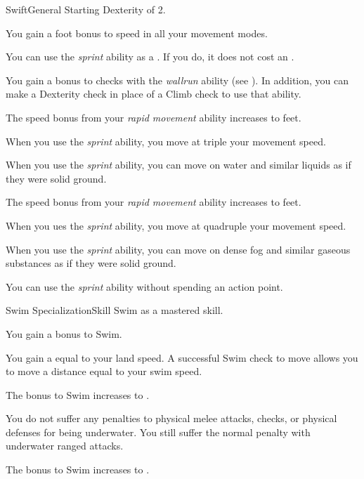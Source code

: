     \begin{feat}{Swift}{General}
        \featpre Starting Dexterity of 2.
        \featben

         You gain a  foot bonus to speed in all your movement modes.

         You can use the \textit{sprint} ability as a .
        If you do, it does not cost an .

         You gain a  bonus to checks with the \textit{wallrun} ability (see ).
        In addition, you can make a Dexterity check in place of a Climb check to use that ability.

         The speed bonus from your \textit{rapid movement} ability increases to  feet.

         When you use the \textit{sprint} ability, you move at triple your movement speed.

         When you use the \textit{sprint} ability, you can move on water and similar liquids as if they were solid ground.

         The speed bonus from your \textit{rapid movement} ability increases to  feet.

         When you ues the \textit{sprint} ability, you move at quadruple your movement speed.

         When you use the \textit{sprint} ability, you can move on dense fog and similar gaseous substances as if they were solid ground.

         You can use the \textit{sprint} ability without spending an action point.
    \end{feat}

    \begin{feat}{Swim Specialization}{Skill}
        \featpre Swim as a mastered skill.
        \featben

         You gain a  bonus to Swim.

        \ff[2]{}

         You gain a  equal to your land speed.
        A successful Swim check to move allows you to move a distance equal to your swim speed.

         The bonus to Swim increases to .

         You do not suffer any penalties to physical melee attacks, checks, or physical defenses for being underwater.
        You still suffer the normal penalty with underwater ranged attacks.

         The bonus to Swim increases to .
    \end{feat}

